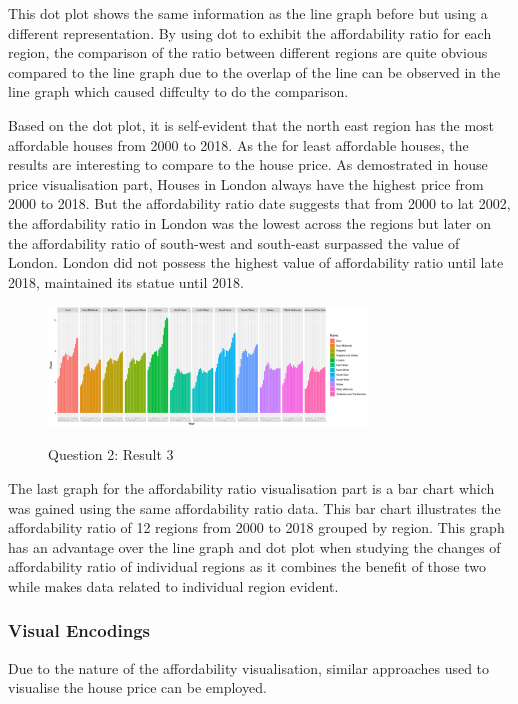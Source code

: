 \documentclass{article}
\begin{document}
This dot plot shows the same information as the line graph before but using a different representation. 
By using dot to exhibit the affordability ratio for each region, the comparison of the ratio between different 
regions are quite obvious compared to the line graph due to the overlap of the line can be observed in the line graph 
which caused diffculty to do the comparison.

Based on the dot plot, it is self-evident that the north east region has the most affordable houses from 2000 
to 2018. As the for least affordable houses, the results are interesting to compare to the house price. 
As demostrated in house price visualisation part, Houses in London always have the highest price from 2000 to 2018.
But the affordability ratio date suggests that from 2000 to lat 2002, the affordability ratio in London was the lowest across the regions but later on the affordability ratio of south-west and south-east surpassed the value of London. 
London did not possess the highest value of affordability ratio until late 2018, maintained its statue until 2018.


\begin{figure}[H]
  \begin{minipage}[b]{1.0\linewidth}
    \centering
    \centerline{\includegraphics[width=8.5cm]{Q2Geom_gridbar}}
    \centerline{Question 2: Result 3}\medskip
  \end{minipage}
\end{figure}

The last graph for the affordability ratio visualisation part is a bar chart which was gained using the same affordability ratio data. This bar chart illustrates the affordability ratio of 12 regions from 2000 to 2018 
grouped by region. This graph has an advantage over the line graph and dot plot when studying the changes of affordability ratio of individual regions as it combines the benefit of those two while makes data related to individual region evident.

\subsubsection{Visual Encodings}
Due to the nature of the affordability visualisation, similar approaches used to visualise the house price can be employed.
\end{document}
